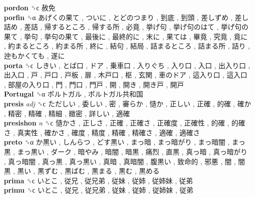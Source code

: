 \textbf{pordon} ␝ϲ   赦免   \\
\textbf{porfin} ␝α   あげくの果て ,  ついに ,  とどのつまり ,  到底 ,  到頭 ,  差しずめ ,  差し詰め ,  差詰 ,  帰するところ ,  帰する所 ,  必竟 ,  挙げ句 ,  挙げ句のはて ,  挙げ句の果て ,  挙句 ,  挙句の果て ,  最後に ,  最終的に ,  末に ,  果ては ,  畢竟 ,  究竟 ,  竟に ,  約まるところ ,  約まる所 ,  終に ,  結句 ,  結局 ,  詰まるところ ,  詰まる所 ,  詰り ,  迚もかくても ,  遂に   \\
\textbf{porta} ␝ϲ   しきい ,  とば口 ,  ドア ,  乗車口 ,  入りぐち ,  入り口 ,  入口 ,  出入り口 ,  出入口 ,  戸 ,  戸口 ,  戸板 ,  扉 ,  木戸口 ,  枢 ,  玄関 ,  車のドア ,  這入り口 ,  這入口 ,  部屋の入り口 ,  門 ,  門口 ,  門戸 ,  開 ,  開き ,  開き戸 ,  開戸   \\
\textbf{Portugal} ␝α   ポルトガル ,  ポルトガル共和国   \\
\textbf{presis} \emph{adj}  ␝ϲ   ただしい ,  委しい ,  密 ,  審らか ,  慥か ,  正しい ,  正確 ,  的確 ,  確か ,  精密 ,  精確 ,  精細 ,  緻密 ,  詳しい ,  適確   \\
\textbf{presishon} \emph{n}  ␝ϲ   慥かさ ,  正しさ ,  正確 ,  正確さ ,  正確度 ,  正確性 ,  的確 ,  的確さ ,  真実性 ,  確かさ ,  確度 ,  精度 ,  精確 ,  精確さ ,  適確 ,  適確さ   \\
\textbf{preto} ␝α   か黒い ,  しんらつ ,  どす黒い ,  まっ暗 ,  まっ暗がり ,  まっ暗闇 ,  まっ黒 ,  まっ黒い ,  ダーク ,  暗やみ ,  暗闇 ,  暗黒 ,  痛烈 ,  直黒 ,  真っ暗 ,  真っ暗がり ,  真っ暗闇 ,  真っ黒 ,  真っ黒い ,  真暗 ,  真暗闇 ,  腹黒い ,  致命的 ,  邪悪 ,  闇 ,  闇黒 ,  黒い ,  黒ずむ ,  黒ばむ ,  黒まる ,  黒む ,  黒める   \\
\textbf{prima} ␝ϲ   いとこ ,  従兄 ,  従兄弟 ,  従妹 ,  従姉 ,  従姉妹 ,  従弟   \\
\textbf{primu} ␝ϲ   いとこ ,  従兄 ,  従兄弟 ,  従妹 ,  従姉 ,  従姉妹 ,  従弟   \\
